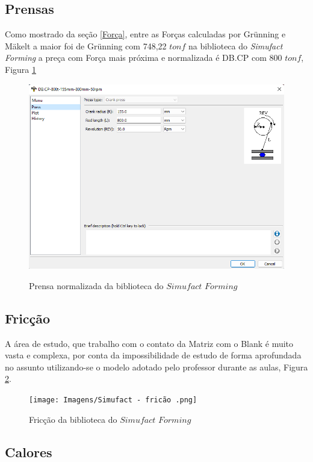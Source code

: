 \documentclass[deposito, acronym, symbols]{fei}
\begin{document}
\subsection{Prensas}

Como mostrado da seção \ref{Força}, entre as Forças calculadas por Grünning e Mäkelt a maior foi de Grünning com 748,22 $tonf$ na biblioteca do \textit{Simufact Forming} a preça com Força mais próxima e normalizada é DB.CP com 800 $tonf$, Figura \ref{fig:Prensa}

\begin{figure}[!htp]
    \centering
    \caption{Prensa normalizada da biblioteca do $Simufact$ $Forming$}
    \includegraphics[width=0.7\linewidth]{Imagens/Simufact - Escolha da Ferramenta Bliblioteca.png}
    \label{fig:Prensa}
\end{figure}

\subsection{Fricção}

A área de estudo, que trabalho com o contato da Matriz com o Blank é muito vasta e complexa, por conta da impossibilidade de estudo de forma aprofundada no assunto utilizando-se o modelo adotado pelo professor durante as aulas, Figura \ref{fig:Fricção}.

\begin{figure}[!htp]
    \centering
    \caption{Fricção da biblioteca do $Simufact$ $Forming$ }
    \texttt{[image: Imagens/Simufact - fricão .png]}
    \label{fig:Fricção}
\end{figure}


\subsection{Calores}
\end{document}
